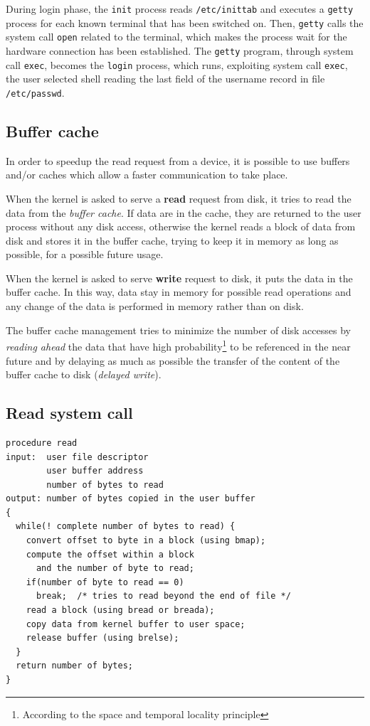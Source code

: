 During login phase, the \texttt{init} process reads \texttt{/etc/inittab} and executes a \texttt{getty} process for each known terminal that has been switched on. Then, \texttt{getty} calls the system call \texttt{open} related to the terminal, which makes the process wait for the hardware connection has been established. The \texttt{getty} program, through system call \texttt{exec}, becomes the \texttt{login} process, which runs, exploiting system call \texttt{exec}, the user selected shell reading the last field of the username record in file \texttt{/etc/passwd}.

\subsection{Buffer cache}
In order to speedup the read request from a device, it is possible to use buffers and/or caches which allow a faster communication to take place.

When the kernel is asked to serve a \textbf{read} request from disk, it tries to read the data from the \emph{buffer cache}. If data are in the cache, they are returned to the user process without any disk access, otherwise the kernel reads a block of data from disk and stores it in the buffer cache, trying to keep it in memory as long as possible, for a possible future usage.

When the kernel is asked to serve \textbf{write} request to disk, it puts the data in the buffer cache. In this way, data stay in memory for possible read operations and any change of the data is performed in memory rather than on disk.

The buffer cache management tries to minimize the number of disk accesses by \emph{reading ahead} the data that have high probability\footnote{According to the space and temporal locality principle} to be referenced in the near future and by delaying as much as possible the transfer of the content of the buffer cache to disk (\emph{delayed write}).

\subsection*{Read system call}
\begin{verbatim}
procedure read
input:  user file descriptor
        user buffer address
        number of bytes to read
output: number of bytes copied in the user buffer
{
  while(! complete number of bytes to read) {
    convert offset to byte in a block (using bmap);
    compute the offset within a block
      and the number of byte to read;
    if(number of byte to read == 0)
      break;  /* tries to read beyond the end of file */
    read a block (using bread or breada);
    copy data from kernel buffer to user space;
    release buffer (using brelse);
  }
  return number of bytes;
}
\end{verbatim}

